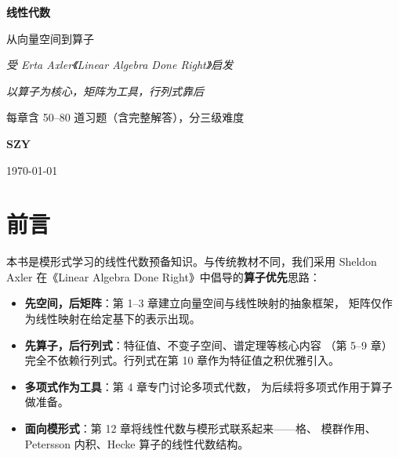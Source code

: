 \documentclass[12pt, a4paper, openany]{book}
\begin{document}
\raggedbottom

\begin{titlepage}

  \centering
  \vspace*{2.2cm}

  {\color{white}\fontsize{36}{44}\selectfont\bfseries 线性代数\par}
  \vspace{0.4cm}
  {\color{white!90}\LARGE 从向量空间到算子\par}
  \vspace{0.3cm}
  {\color{white!70}\large\itshape 受 Erta Axler《Linear Algebra Done Right》启发\par}

  \vspace{3cm}

  {\large\itshape 以算子为核心，矩阵为工具，行列式靠后\par}
  \vspace{0.3cm}
  {\normalsize 每章含 50--80 道习题（含完整解答），分三级难度\par}

  \vfill

  {\Large\bfseries SZY\par}
  \vspace{0.3cm}
  {\normalsize \today\par}
  \vspace{2.5cm}
\end{titlepage}

\chapter*{前言}

本书是模形式学习的线性代数预备知识。与传统教材不同，我们采用 Sheldon Axler
在《Linear Algebra Done Right》中倡导的\textbf{算子优先}思路：

\begin{itemize}
  \item \textbf{先空间，后矩阵}：第 1--3 章建立向量空间与线性映射的抽象框架，
    矩阵仅作为线性映射在给定基下的表示出现。
  \item \textbf{先算子，后行列式}：特征值、不变子空间、谱定理等核心内容
    （第 5--9 章）完全不依赖行列式。行列式在第 10 章作为特征值之积优雅引入。
  \item \textbf{多项式作为工具}：第 4 章专门讨论多项式代数，
    为后续将多项式作用于算子做准备。
  \item \textbf{面向模形式}：第 12 章将线性代数与模形式联系起来——格、
    模群作用、Petersson 内积、Hecke 算子的线性代数结构。
\end{itemize}
\end{document}
